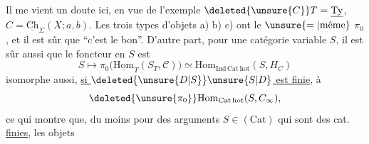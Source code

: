 Il me vient un doute ici, en vue de l'exemple $\deleted{\unsure{C}}T=\underline{\mathrm{Ty}}$, $C=\underline{\mathrm{Ch}}_\Sigma(X;a,b)$. Les trois types d'objets a) b) c) ont le $\unsure{=|\text{même}}$ $\pi_0$, et il est sûr que ``c'est le bon''. D'autre part, pour une catégorie  variable $S$, il est sûr aussi que le  foncteur en $S$ est
\[
S\longmapsto\pi_0\bigl(\underline{\mathrm{Hom}}_T(S_T,\mathcal C)\bigr)\simeq\mathrm{Hom}_{\mathrm{Ind\,Cat\,hot}}(S,H_C)
\]
isomorphe aussi, \uline{si $\deleted{\unsure{D|S}}\unsure{S|D}$ est finie}, à
\[
\deleted{\unsure{\pi_0}}\mathrm{Hom}_{\mathrm{Cat\,hot}}(S,C_\infty),
\]
ce qui montre que, du moins pour des arguments $S\in(\mathrm{Cat})$ qui sont des cat. \uline{finies}, les objets

